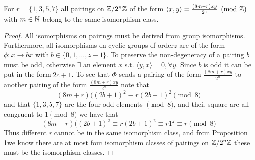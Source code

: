 \documentclass{amsart}
\begin{document}
 \begin{lem} For $r=\{1, 3, 5, 7\}$ all pairings on $\mathbb{Z}/2^{n}\mathbb{Z}$ of
the form $\langle x, y\rangle=\frac{(8m+r)xy}{2^{n}}\pmod{\mathbb{Z}}$ with
$m\in \mathbb{N}$ belong to the same isomorphism class.
 \end{lem}
 \begin{proof} All isomorphisms on pairings must be derived from group
isomorphisms. Furthermore, all isomorphisms on cyclic groups of
order$z$ are of the form $\phi:x\to bx$ with $b\in\{0, 1, \dots,
z-1\}$. To preserve the non-degeneracy of a pairing $b$ must be odd,
otherwise $\exists$ an element $x$ s.t. $\langle y, x\rangle=0,
\forall y$. Since $b$ is odd it can be put in the form $2c+1$. To see
that $\Phi$ sends a pairing of the form $\frac{(8m+r)xy}{2^{n}}$ to
another pairing of the form $\frac{(8m+r)xy}{2^{n}}$ note that
   \[ (8m+r)((2b+1)^{2}\equiv r(2b+1)^{2}\pmod 8
   \] and that $\{1, 3, 5, 7\}$ are the four odd elements $\pmod 8$,
and their square are all congruent to $1\pmod8$ we have that
   \[ (8m+r)((2b+1)^{2}\equiv r(2b+1)^{2}\equiv r1^{2}\equiv r\pmod8
   \] Thus different $r$ cannot be in the same isomorphism class, and
from Proposition 1we know there are at most four isomorphism classes
of pairings on $\mathbb{Z}/2^{n}\mathbb{Z}$ these must be the isomorphism classes.
 \end{proof}
\end{document}
